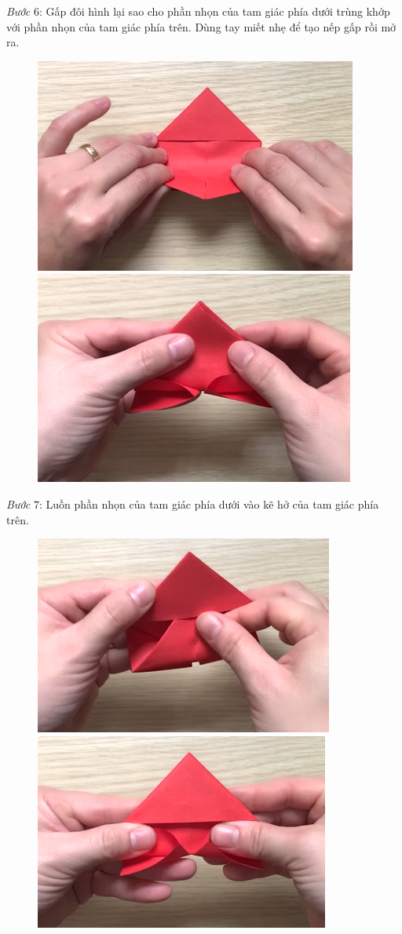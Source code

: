 \begin{multicols}{2}
\begin{figure}[H]
			\vspace*{-10pt}
		\end{figure}
	\textit{Bước} $6$: Gấp đôi hình lại sao cho phần nhọn của tam giác phía dưới trùng khớp với phần nhọn của tam giác phía trên. Dùng tay miết nhẹ để tạo nếp gấp rồi mở ra.
	\begin{figure}[H]
			\vspace*{-5pt}
			\centering
			\captionsetup{labelformat= empty, justification=centering}
			\includegraphics[height=0.327\linewidth]{31}
			\includegraphics[height=0.327\linewidth]{32}
			\vspace*{-15pt}
		\end{figure}
	\textit{Bước} $7$: Luồn phần nhọn của tam giác phía dưới vào kẽ hở của tam giác phía trên.
	\begin{figure}[H]
			\vspace*{-5pt}
			\centering
			\captionsetup{labelformat= empty, justification=centering}
			\includegraphics[height=0.327\linewidth]{33}
			\includegraphics[height=0.327\linewidth]{34}

\end{figure}
\end{multicols}
